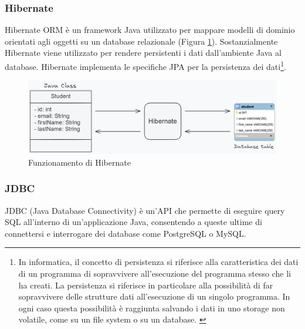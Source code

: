 \subsubsection{Hibernate}
Hibernate ORM è un framework Java utilizzato per mappare modelli di dominio orientati agli oggetti su un database relazionale (Figura \ref{fig:hibernate}).
Sostanzialmente Hibernate viene utilizzato per rendere persistenti i dati dall'ambiente Java al database.
Hibernate implementa le specifiche JPA per la persistenza dei dati\footnote{In informatica, il concetto di persistenza si riferisce alla caratteristica dei dati di un programma di sopravvivere all'esecuzione del programma stesso che li ha creati.
La persistenza si riferisce in particolare alla possibilità di far sopravvivere delle strutture dati all'esecuzione di un singolo programma. In ogni caso questa possibilità è raggiunta salvando i dati in uno storage non volatile, come su un file system o su un database. \cite{persistenza}}.\cite{hibernate}
\\
\begin{figure}[h]
    \centering
    \includegraphics[width=1.0\textwidth]{images/hibernate.png}
    \caption{Funzionamento di Hibernate}
    \label{fig:hibernate}
\end{figure}

\subsubsection{JDBC}
JDBC (Java Database Connectivity) è un'API che permette di eseguire query SQL all'interno di un'applicazione Java, consentendo a queste ultime di connettersi e interrogare dei database come PostgreSQL o MySQL.\cite{jdbc}

\newpage
